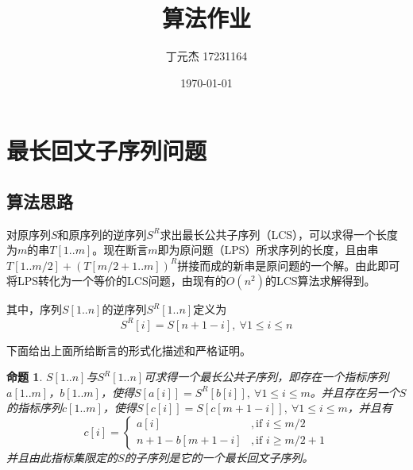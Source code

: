 \documentclass[UTF8]{ctexart}
\title{算法作业}
\author{丁元杰 17231164}
\date{\today}
\newtheorem{proposition}{命题}
\begin{document}
\maketitle

\section{最长回文子序列问题}
    \subsection*{算法思路}
    对原序列$S$和原序列的逆序列$S^R$求出最长公共子序列（LCS），可以求得一个长度为$m$的串$T[1..m]$。现在断言$m$即为原问题（LPS）所求序列的长度，且由串$T[1..m/2]+(T[m/2+1..m])^R$拼接而成的新串是原问题的一个解。由此即可将LPS转化为一个等价的LCS问题，由现有的$O(n^2)$的LCS算法求解得到。

    其中，序列$S[1..n]$的逆序列$S^R[1..n]$定义为
    $$S^R[i] = S[n+1-i],\ \forall 1\leq i \leq n$$

    下面给出上面所给断言的形式化描述和严格证明。

    \begin{proposition}
        $S[1..n]$与$S^R[1..n]$可求得一个最长公共子序列，即存在一个指标序列$a[1..m]$，$b[1..m]$，使得$S[a[i]]=S^R[b[i]],\ \forall 1\leq i \leq m$。并且存在另一个$S$的指标序列$c[1..m]$，使得$S[c[i]] = S[c[m+1-i]],\ \forall 1 \leq i \leq m$，并且有
        \begin{equation*}
            c[i] = \begin{cases}
                a[i] &, \text{if $i \leq m/2$} \\
                n+1-b[m+1-i] &, \text{if $i \geq m/2+1$}
            \end{cases}
        \end{equation*}
        并且由此指标集限定的$S$的子序列是它的一个最长回文子序列。
    \end{proposition}
\end{document}
